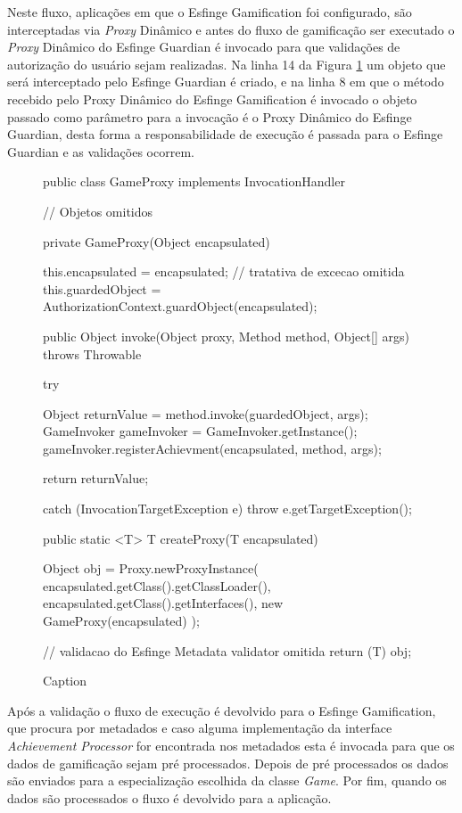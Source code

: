 Neste fluxo, aplicações em que o Esfinge Gamification foi configurado, são interceptadas via \textit{Proxy} Dinâmico e antes do fluxo de gamificação ser executado o \textit{Proxy} Dinâmico do Esfinge Guardian é invocado para que validações de autorização do usuário sejam realizadas. Na linha 14 da Figura \ref{fig:esfinge-proxy} um objeto que será interceptado pelo Esfinge Guardian é criado, e na linha 8 em que o método recebido pelo Proxy Dinâmico do Esfinge Gamification é invocado o objeto passado como parâmetro para a invocação é o Proxy Dinâmico do Esfinge Guardian, desta forma a responsabilidade de execução é passada para o Esfinge Guardian e as validações ocorrem.

\begin{figure}[H]
    \centering
    \begin{java}
public class GameProxy implements InvocationHandler {

    // Objetos omitidos

    private GameProxy(Object encapsulated) {
                this.encapsulated = encapsulated;
    	// tratativa de excecao omitida
    	this.guardedObject = AuthorizationContext.guardObject(encapsulated);
    	
    }

    public Object invoke(Object proxy, Method method, Object[] args) throws Throwable {
    	try {
        	Object returnValue = method.invoke(guardedObject, args);
        	GameInvoker gameInvoker = GameInvoker.getInstance();
        	gameInvoker.registerAchievment(encapsulated, method, args);
    
    	    return returnValue;
    	} catch (InvocationTargetException e) {
    	    throw e.getTargetException();
    	}
    }
    
    public static <T> T createProxy(T encapsulated) {
    	Object obj = Proxy.newProxyInstance(
                    encapsulated.getClass().getClassLoader(),
                    encapsulated.getClass().getInterfaces(), 
                    new GameProxy(encapsulated)
    	);
    
    	// validacao do Esfinge Metadata validator omitida
    	return (T) obj;
    }
}
    \end{java}
    \caption{Caption}
    \label{fig:esfinge-proxy}
\end{figure}


Após a validação o fluxo de execução é devolvido para o Esfinge Gamification, que procura por metadados e caso alguma implementação da interface \textit{Achievement Processor} for encontrada nos metadados esta é invocada para que os dados de gamificação sejam pré processados. Depois de pré processados os dados são enviados para a especialização escolhida da classe \textit{Game}. Por fim, quando os dados são processados o fluxo é devolvido para a aplicação.

